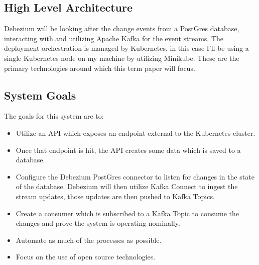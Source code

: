 \begin{flushleft}
	\subsection{High Level Architecture}
	Debezium will be looking after the change events from a PostGres database, interacting with and utilizing Apache Kafka \autocite{ApacheKafka} for the event streams.
	The deployment orchestration is managed by Kubernetes, in this case I'll be using a single Kubernetes node on my machine by utilizing Minikube\autocite{MinikubeStart}.
	These are the primary technologies around which this term paper will focus.

	\subsection{System Goals}
	The goals for this system are to:
	\begin{itemize}
		\item Utilize an API which exposes an endpoint external to the Kubernetes cluster.
		\item Once that endpoint is hit, the API creates some data which is saved to a database.
		\item Configure the Debezium PostGres connector to listen for changes in the state of the database. Debezium will then utilize Kafka Connect to ingest the stream updates,
		      those updates are then pushed to Kafka Topics.
		\item Create a consumer which is subscribed to a Kafka Topic to consume the changes and prove the system is operating nominally.
		\item Automate as much of the processes as possible.
		\item Focus on the use of open source technologies.
	\end{itemize}

\end{flushleft}
